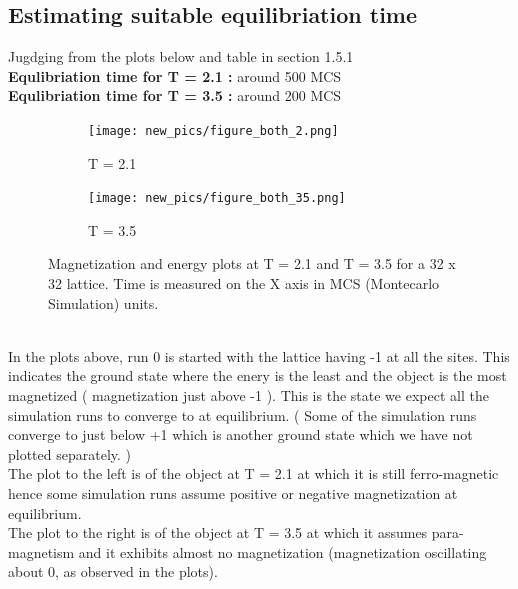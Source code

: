 \documentclass[a4paper,11pt]{article}
\begin{document}
\subsection{Estimating suitable equilibriation time}
Jugdging from the plots below and table in section 1.5.1\\
\textbf{Equlibriation time for T  = 2.1 :} around 500 MCS\\
\textbf{Equlibriation time for T  = 3.5 :} around 200 MCS\\
\begin{figure}[!htb]
    \begin{subfigure}[b]{0.5\textwidth}
    \texttt{[image: new\_pics/figure\_both\_2.png]}
    \caption{T = 2.1}
	\label{fig:t2both}
\end{subfigure}
\begin{subfigure}[b]{0.5\textwidth}
    \texttt{[image: new\_pics/figure\_both\_35.png]}
    \caption{T = 3.5}
	\label{fig:t3mag}
\end{subfigure}
\caption{Magnetization and energy plots at T = 2.1 and T = 3.5 for a 32 x 32 lattice. Time is measured on the X axis in MCS (Montecarlo Simulation) units.}
\end{figure}
\\
In the plots above, run 0 is started with the lattice having -1 at all the sites. This indicates the ground state where the enery is the least and the object is the most magnetized ( magnetization just above -1 ). This is the state we expect all the simulation runs to converge to at equilibrium. ( Some of the simulation runs converge to just below +1 which is another ground state which we have not plotted separately. )
\\
The plot to the left is of the object at T = 2.1 at which it is still ferro-magnetic hence some simulation runs assume positive or negative magnetization at equilibrium.\\
The plot to the right is of the object at T = 3.5 at which it assumes para-magnetism and it exhibits almost no magnetization (magnetization oscillating about 0, as observed in the plots).
\clearpage
\end{document}
